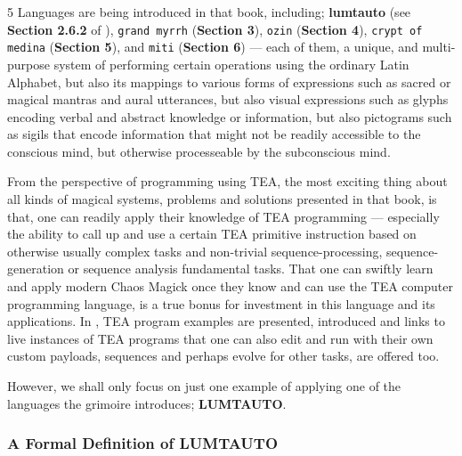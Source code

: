 \documentclass[a4paper, 18pt]{book} %
\begin{document}
5 Languages are being introduced in that book, including; \textbf{lumtauto}
(see \textbf{Section 2.6.2} of \cite{lutalo_2025_grimlumtauto}), \texttt{grand myrrh} (\textbf{Section 3}\cite{lutalo_2025_grimlumtauto}), \texttt{ozin} (\textbf{Section 4}\cite{lutalo_2025_grimlumtauto}), \texttt{crypt of medina} (\textbf{Section 5}\cite{lutalo_2025_grimlumtauto}), and \texttt{miti} (\textbf{Section 6}\cite{lutalo_2025_grimlumtauto}) --- each of them, a unique, and multi-purpose system of performing certain operations using the ordinary Latin Alphabet, but also its mappings to various forms of expressions such as sacred or magical mantras and aural utterances, but also visual expressions such as glyphs encoding verbal and abstract knowledge or information, but also pictograms such as sigils\cite{lutalo_2025_grimlumtauto} that encode information that might not be readily accessible to the conscious mind, but otherwise processeable by the subconscious mind. 

\vspace{2em}

From the perspective of programming using TEA, the most exciting thing about all kinds of magical systems, problems and solutions presented in that book, is that, one can readily apply their knowledge of TEA programming --- especially the ability to call up and use a certain TEA primitive instruction based on otherwise usually complex tasks and non-trivial sequence-processing, sequence-generation or sequence analysis fundamental tasks. That one can swiftly learn and apply modern Chaos Magick once they know and can use the TEA computer programming language, is a true bonus for investment in this language and its applications. In \cite{lutalo_2025_grimlumtauto}, TEA program examples are presented, introduced and links to live instances of TEA programs that one can also edit and run with their own custom payloads, sequences and perhaps evolve for other tasks, are offered too.

\vspace{2em}

However, we shall only focus on just one example of applying one of the languages the grimoire introduces; \textbf{LUMTAUTO}.


\subsubsection{A Formal Definition of LUMTAUTO}
\end{document}
